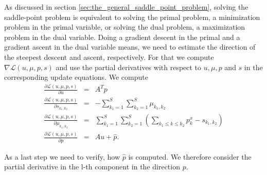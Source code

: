\documentclass{scrreprt}
\begin{document}
        As discussed in section \ref{sec:the_general_saddle_point_problem}, solving the saddle-point problem is equivalent to solving the primal problem, a minimization problem in the primal variable, or solving the dual problem, a maximization problem in the dual variable. Doing a gradient descent in the primal and a gradient ascent in the dual variable means, we need to estimate the direction of the steepest descent and ascent, respectively. For that we compute $\nabla \mathcal{L}(u, \mu, p, s)$ and use the partial derivatives with respect to $u, \mu, p$ and $s$ in the corresponding update equations. We compute
            \begin{eqnarray}
                \frac{\partial \mathcal{L}(u, \mu, p, s)}{\partial u} &=& A^{T} p \\
                \frac{\partial \mathcal{L}(u, \mu, p, s)}{\partial s_{k_{1}, k_{2}}} &=& -\sum_{k_{1} = 1}^{S} \sum_{k_{2} = 1}^{S} \mu_{k_{1}, k_{2}} \\
                \frac{\partial \mathcal{L}(u, \mu, p, s)}{\partial \mu_{k_{1}, k_{2}}} &=& \sum_{k_{1} = 1}^{S} \sum_{k_{2} = 1}^{S} \left( \sum_{k_{1} \le k \le k_{2}} p^{x}_{k} - s_{k_{1}, k_{2}} \right) \\
                \frac{\partial \mathcal{L}(u, \mu, p, s)}{\partial p} &=& Au + \hat{p}.
            \end{eqnarray}

        As a last step we need to verify, how $\hat{p}$ is computed. We therefore consider the partial derivative in the l-th component in the direction $p$.
\end{document}

